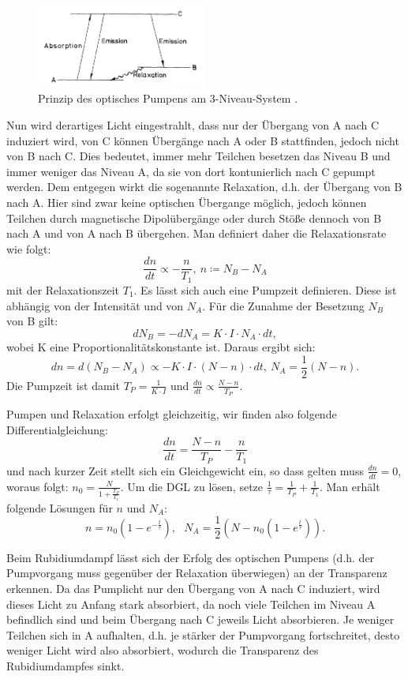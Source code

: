 \documentclass[bigchapter,colorback,accentcolor=tud4b,linedtoc,11pt]{tudreport}
\begin{document}
\begin{figure}[H] 
  \centering
     \includegraphics[width=0.5\textwidth]{img/Pumpen.jpg}
     \caption{Prinzip des optisches Pumpens am 3-Niveau-System \cite{Anleitung}.}
\end{figure}

Nun wird derartiges Licht eingestrahlt, dass nur der Übergang von A nach C induziert wird, von C können Übergänge nach A oder B stattfinden, jedoch nicht von B nach C. Dies bedeutet, immer mehr Teilchen besetzen das Niveau B und immer weniger das Niveau A, da sie von dort kontunierlich nach C gepumpt werden. Dem entgegen wirkt die sogenannte Relaxation, d.h. der Übergang von B nach A. Hier sind zwar keine optischen Übergange möglich, jedoch können Teilchen durch magnetische Dipolübergänge oder durch Stöße dennoch von B nach A und von A nach B übergehen. Man definiert daher die Relaxationsrate wie folgt: 
$$\frac{d n}{d t} \propto - \frac{n}{T_1},~ n \coloneqq N_B-N_A$$
mit der Relaxationszeit $T_1$. Es lässt sich auch eine Pumpzeit definieren. Diese ist abhängig von der Intensität und von $N_A$. Für die Zunahme der Besetzung $N_B$ von B gilt:
$$d N_B = - d N_A = K \cdot I \cdot N_A \cdot d t,$$
wobei K eine Proportionalitätskonstante ist. Daraus ergibt sich:
$$d n = d (N_B-N_A) \propto -K \cdot I \cdot (N-n) \cdot d t,~ N_A = \frac{1}{2} (N-n).$$ 
Die Pumpzeit ist damit $T_P = \frac{1}{K \cdot I}$ und $\frac{d n}{d t} \propto \frac{N-n}{T_P}$.

Pumpen und Relaxation erfolgt gleichzeitig, wir finden also folgende Differentialgleichung:
$$\frac{d n}{d t} = \frac{N-n}{T_P} - \frac{n}{T_1}$$
und nach kurzer Zeit stellt sich ein Gleichgewicht ein, so dass gelten muss $\frac{d n}{d t} = 0$, woraus folgt: $n_0 = \frac{N}{1+\frac{T_P}{T_1}}$. Um die DGL zu lösen, setze $\frac{1}{\tau} = \frac{1}{T_P} + \frac{1}{T_1}$. Man erhält folgende Lösungen für $n$ und $N_A$:
$$n = n_0 (1-e^{-\frac{t}{\tau}}),~~~ N_A = \frac{1}{2} (N-n_0 (1-e^{\frac{t}{\tau}})).$$

Beim Rubidiumdampf lässt sich der Erfolg des optischen Pumpens (d.h. der Pumpvorgang muss gegenüber der Relaxation überwiegen) an der Transparenz erkennen. Da das Pumplicht nur den Übergang von A nach C induziert, wird dieses Licht zu Anfang stark absorbiert, da noch viele Teilchen im Niveau A befindlich sind und beim Übergang nach C jeweils Licht absorbieren. Je weniger Teilchen sich in A aufhalten, d.h. je stärker der Pumpvorgang fortschreitet, desto weniger Licht wird also absorbiert, wodurch die Transparenz des Rubidiumdampfes sinkt. 
\end{document}
